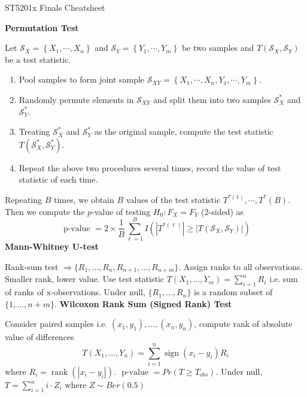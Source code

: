 \documentclass[a4paper]{article}
\newcommand{\subheading}[1]{{\scriptsize\textbf{#1}}}
\begin{document}
\scriptsize                         %
\setlength\parindent{0pt}           %
\setlength{\abovedisplayskip}{3pt}  %
\setlength{\belowdisplayskip}{3pt}  %

\begin{center}
  {\large ST5201x Finals Cheatsheet}
\end{center}

\begin{multicols*}{4}

\subheading{Permutation Test}

Let $\mathcal{S}_X=\left\{X_1, \cdots, X_n\right\}$ and $\mathcal{S}_Y=\left\{Y_1, \cdots, Y_m\right\}$ be two samples and $T\left(\mathcal{S}_X, \mathcal{S}_Y\right)$ be a test statistic. 
\begin{enumerate}
    \item Pool samples to form joint sample $\mathcal{S}_{X Y}=\left\{X_1, \cdots, X_n, Y_1, \cdots, Y_m\right\}$.
    \item Randomly permute elements in $\mathcal{S}_{X Y}$ and split them into two samples $\mathcal{S}_X^*$ and $\mathcal{S}_Y^*$.
    \item Treating $\mathcal{S}_X^*$ and $\mathcal{S}_Y^*$ as the original sample, compute the test statistic $T\left(\mathcal{S}_X^*, \mathcal{S}_Y^*\right)$.
    \item Repeat the above two procedures several times, record the value of test statistic of each time.
\end{enumerate}
Repeating $B$ times, we obtain $B$ values of the test statistic $T^{*(1)}, \cdots, T^*(B)$. Then we compute the $p$-value of testing $H_0: F_X = F_Y$ (2-sided) as
$$
\text { p-value }=2 \times \frac{1}{B} \sum_{\ell=1}^B I\left(\left|T^{*(\ell)}\right| \geq\left|T\left(\mathcal{S}_X, \mathcal{S}_Y\right)\right|\right)
$$
\subheading{Mann-Whitney U-test}

Rank-sum test $\Rightarrow \{R_1,\dots, R_n, R_{n+1},\dots,R_{n+m}\}$. 
Assign ranks to all observations. Smaller rank, lower value. Use test statistic $T(X_1,\dots,Y_m) = \sum_{i=1}^{n} R_i$ i.e. sum of ranks of x-observations. Under null, $\{R_1,\dots, R_n\}$ is a random subset of $\{1,\dots, n+m\}$.
\smallskip
\subheading{Wilcoxon Rank Sum (Signed Rank) Test}

Consider paired samples i.e. $(x_1,y_1),\dots,(x_n,y_n)$, compute rank of absolute value of differences
$$
T(X_1,\dots,Y_n) = \sum_{i=1}^{n} \operatorname{sign}(x_i-y_i)R_i
$$
where $R_i = \operatorname{rank}(|x_i-y_i|)$. $\text { p-value } = Pr(T\geq T_{obs})$. Under null, $T = \sum_{i=1}^n i \cdot Z_i$ where $Z\sim Ber(0.5)$


\end{multicols*}
\end{document}

